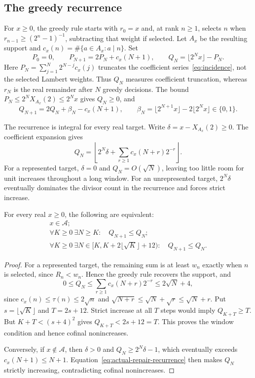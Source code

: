 \documentclass[11pt]{article}
\newcommand{\Ach}{\mathcal A}
\begin{document}
\subsection{The greedy recurrence}\label{sec:actual-repairs}
For $x\ge0$, the greedy rule starts with $r_0=x$ and, at rank $n\ge1$,
selects $n$ when $r_{n-1}\ge(2^n-1)^{-1}$, subtracting that weight if
selected.  Let $A_x$ be the resulting support and
$c_x(n)=\#\{a\in A_x:a\mid n\}$.  Set
\[
 P_0=0,\qquad P_{N+1}=2P_N+c_x(N+1),\qquad
 Q_N=\lfloor2^Nx\rfloor-P_N.
\]
Here $P_N=\sum_{j=1}^N2^{N-j}c_x(j)$ truncates the coefficient
series~\eqref{eq:incidence}, not the selected Lambert weights.
Thus $Q_N$ measures coefficient truncation, whereas $r_N$ is the
real remainder after $N$ greedy decisions. The bound
$P_N\le2^NX_{A_x}(2)\le2^Nx$ gives $Q_N\ge0$, and
\begin{equation}
 Q_{N+1}=2Q_N+\beta_N-c_x(N+1),\qquad
 \beta_N=\lfloor2^{N+1}x\rfloor-2\lfloor2^Nx\rfloor\in\{0,1\}.
 \label{eq:actual-repair-recurrence}
\end{equation}

The recurrence is integral for every real target. Write
$\delta=x-X_{A_x}(2)\ge0$. The coefficient expansion gives
\[
 Q_N=\left\lfloor 2^N\delta+
             \sum_{r\ge1}c_x(N+r)2^{-r}\right\rfloor.
\]
For a represented target, $\delta=0$ and $Q_N=O(\sqrt N)$, leaving
too little room for unit increases throughout a long window.
For an unrepresented target, $2^N\delta$ eventually dominates the
divisor count in the recurrence and forces strict increase.


\begin{theorem}\label{res:general-repair}
For every real $x\ge0$, the following are equivalent:
\[
 \begin{gathered}
 x\in\Ach;\\
 \forall K\ge0\ \exists N\ge K:\quad Q_{N+1}\le Q_N;\\
 \forall K\ge0\ \exists N\in[K,K+2\lfloor\sqrt K\rfloor+12):
 \quad Q_{N+1}\le Q_N.
 \end{gathered}
\]
\end{theorem}

\begin{proof}
For a represented target, the remaining sum is at least $w_n$ exactly
when $n$ is selected, since $R_n<w_n$. Hence the greedy rule recovers
the support, and
\[
 0\le Q_N\le\sum_{r\ge1}c_x(N+r)2^{-r}
 \le2\sqrt N+4,
\]
since $c_x(n)\le\tau(n)\le2\sqrt n$ and
$\sqrt{N+r}\le\sqrt N+\sqrt r\le\sqrt N+r$.
Put $s=\lfloor\sqrt K\rfloor$ and $T=2s+12$.
Strict increase at all $T$ steps would imply $Q_{K+T}\ge T$.
But $K+T<(s+4)^2$ gives $Q_{K+T}<2s+12=T$.
This proves the window condition and hence cofinal nonincreases.

Conversely, if $x\notin\Ach$, then $\delta>0$ and
$Q_N\ge2^N\delta-1$, which eventually exceeds
$c_x(N+1)\le N+1$.
Equation~\eqref{eq:actual-repair-recurrence} then makes $Q_N$ strictly
increasing, contradicting cofinal nonincreases.
\end{proof}
\end{document}

